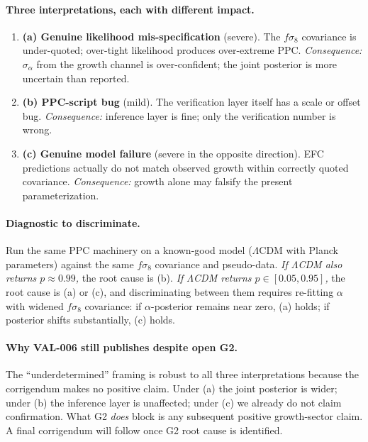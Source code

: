 \documentclass[11pt]{article}
\begin{document}
\paragraph{Three interpretations, each with different impact.}
\begin{enumerate}[leftmargin=*]
\item \textbf{(a) Genuine likelihood mis-specification} (severe). The
$f\sigma_8$ covariance is under-quoted; over-tight likelihood produces
over-extreme PPC. \emph{Consequence:} $\sigma_\alpha$ from the growth
channel is over-confident; the joint posterior is more uncertain than
reported.

\item \textbf{(b) PPC-script bug} (mild). The verification layer itself
has a scale or offset bug. \emph{Consequence:} inference layer is fine;
only the verification number is wrong.

\item \textbf{(c) Genuine model failure} (severe in the opposite
direction). EFC predictions actually do not match observed growth within
correctly quoted covariance. \emph{Consequence:} growth alone may
falsify the present parameterization.
\end{enumerate}

\paragraph{Diagnostic to discriminate.}
Run the same PPC machinery on a known-good model ($\Lambda$CDM with
Planck parameters) against the same $f\sigma_8$ covariance and pseudo-data.
\emph{If $\Lambda$CDM also returns $p\approx0.99$,} the root cause is (b).
\emph{If $\Lambda$CDM returns $p\in[0.05, 0.95]$,} the root cause is (a)
or (c), and discriminating between them requires re-fitting $\alpha$ with
widened $f\sigma_8$ covariance: if $\alpha$-posterior remains near zero,
(a) holds; if posterior shifts substantially, (c) holds.

\paragraph{Why VAL-006 still publishes despite open G2.} The
``underdetermined'' framing is robust to all three interpretations because
the corrigendum makes no positive claim. Under (a) the joint
posterior is wider; under (b) the inference layer is unaffected; under
(c) we already do not claim confirmation. What G2 \emph{does} block is
any subsequent positive growth-sector claim. A final
corrigendum will follow once G2 root cause is identified.
\end{document}
